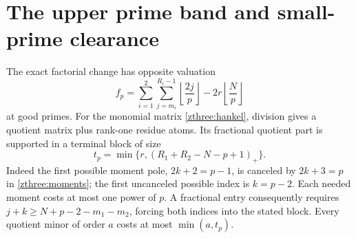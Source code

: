 \documentclass[11pt]{article}
\theoremstyle{definition}\newtheorem{definition}[theorem]{Definition}
\theoremstyle{remark}\newtheorem{remark}[theorem]{Remark}
\begin{document}
\section{The upper prime band and small-prime clearance}
\label{zthree:monomial}

The exact factorial change has opposite valuation
\begin{equation}\label{zthree:factorial}
 f_p=\sum_{i=1}^2\sum_{j=m_i}^{R_i-1}\left\lfloor\frac{2j}{p}\right\rfloor
            -2r\left\lfloor\frac Np\right\rfloor
\end{equation}
at good primes. For the monomial matrix \eqref{zthree:hankel}, division
gives a quotient matrix plus rank-one residue atoms. Its fractional
quotient part is supported in a terminal block of size
\begin{equation}\label{zthree:terminal}
 t_p=\min\{r,(R_1+R_2-N-p+1)_+\}.
\end{equation}
Indeed the first possible moment pole, $2k+2=p-1$, is canceled by
$2k+3=p$ in \eqref{zthree:moments}; the first uncanceled possible
index is $k=p-2$. Each needed moment costs at most one power of $p$.
A fractional entry consequently requires
$j+k\ge N+p-2-m_1-m_2$, forcing both indices into the stated block.
Every quotient minor of order $a$ costs at most $\min(a,t_p)$.
\end{document}
